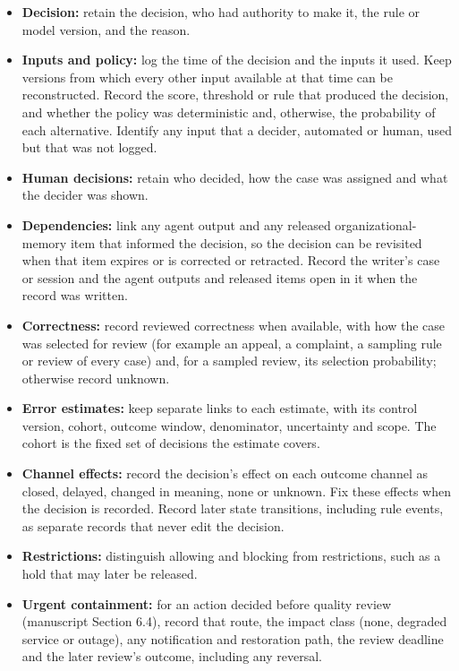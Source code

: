 \documentclass[
  11pt,
]{article}
\providecommand{\tightlist}{%
  \setlength{\itemsep}{0pt}\setlength{\parskip}{0pt}}
\renewcommand{\tightlist}{\setlength{\itemsep}{0pt plus 1pt}\setlength{\parskip}{0pt}}
\begin{document}
\begin{itemize}
\tightlist
\item
  \textbf{Decision:} retain the decision, who had authority to make it,
  the rule or model version, and the reason.
\item
  \textbf{Inputs and policy:} log the time of the decision and the
  inputs it used. Keep versions from which every other input available
  at that time can be reconstructed. Record the score, threshold or rule
  that produced the decision, and whether the policy was deterministic
  and, otherwise, the probability of each alternative. Identify any
  input that a decider, automated or human, used but that was not
  logged.
\item
  \textbf{Human decisions:} retain who decided, how the case was
  assigned and what the decider was shown.
\item
  \textbf{Dependencies:} link any agent output and any released
  organizational-memory item that informed the decision, so the decision
  can be revisited when that item expires or is corrected or retracted.
  Record the writer's case or session and the agent outputs and released
  items open in it when the record was written.
\item
  \textbf{Correctness:} record reviewed correctness when available, with
  how the case was selected for review (for example an appeal, a
  complaint, a sampling rule or review of every case) and, for a sampled
  review, its selection probability; otherwise record unknown.
\item
  \textbf{Error estimates:} keep separate links to each estimate, with
  its control version, cohort, outcome window, denominator, uncertainty
  and scope. The cohort is the fixed set of decisions the estimate
  covers.
\item
  \textbf{Channel effects:} record the decision's effect on each outcome
  channel as closed, delayed, changed in meaning, none or unknown. Fix
  these effects when the decision is recorded. Record later state
  transitions, including rule events, as separate records that never
  edit the decision.
\item
  \textbf{Restrictions:} distinguish allowing and blocking from
  restrictions, such as a hold that may later be released.
\item
  \textbf{Urgent containment:} for an action decided before quality
  review (manuscript Section 6.4), record that route, the impact class
  (none, degraded service or outage), any notification and restoration
  path, the review deadline and the later review's outcome, including
  any reversal.
\end{itemize}
\end{document}
